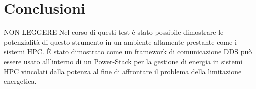\chapter{Conclusioni}


NON LEGGERE
Nel corso di questi test è stato possibile dimostrare le potenzialità di questo strumento in un ambiente altamente prestante come i sistemi HPC. 
È stato dimostrato come un framework di comunicazione DDS può essere usato all'interno di un Power-Stack per la gestione di energia in sistemi HPC vincolati dalla potenza al fine di affrontare il problema della limitazione energetica. %